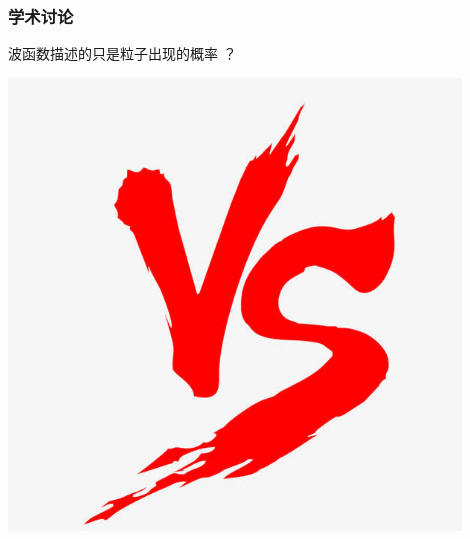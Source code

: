 \begin{frame}
    \frametitle{学术讨论}
    {\color{red} \Large 波函数描述的只是粒子出现的概率 ？}  
    \begin{center}
        \includegraphics[width=0.9\textwidth]{figs/2021-12-06-11-44-50.png} \\
    \end{center} 
\end{frame}


